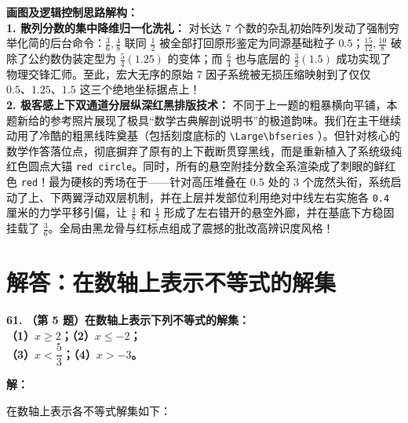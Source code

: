 \vspace{0.4cm}
{\small\color{blue!70!black}
\textbf{画图及逻辑控制思路解构：}\\
\textbf{1. 散列分数的集中降维归一化洗礼：} 对长达 $7$ 个数的杂乱初始阵列发动了强制穷举化简的后台命令：$\frac{3}{6}, \frac{4}{8}$ 联同 $\frac{1}{2}$ 被全部打回原形鉴定为同源基础粒子 $0.5$；$\frac{15}{12}, \frac{10}{8}$ 破除了公约数伪装定型为 $\frac{5}{4} (1.25)$ 的变体；而 $\frac{6}{4}$ 也与底层的 $\frac{3}{2} (1.5)$ 成功实现了物理交锋汇师。至此，宏大无序的原始 $7$ 因子系统被无损压缩映射到了仅仅 $0.5、 1.25、 1.5$ 这三个绝地坐标据点上！\\
\textbf{2. 极客感上下双通道分层纵深红黑排版技术：} 不同于上一题的粗暴横向平铺，本题新给的参考照片展现了极具“数学古典解剖说明书”的极道韵味。我们在主干继续动用了冷酷的粗黑线阵奠基（包括刻度底标的 \texttt{\textbackslash{}Large\textbackslash{}bfseries} ）。但针对核心的数学作答落位点，彻底摒弃了原有的上下截断贯穿黑线，而是重新植入了系统级纯红色圆点大锚 \texttt{red circle}。同时，所有的悬空附挂分数全系渲染成了刺眼的鲜红色 \texttt{red}！最为硬核的秀场在于——针对高压堆叠在 $0.5$ 处的 $3$ 个庞然头衔，系统启动了上、下两翼浮动双层机制，并在上层并发部位利用绝对中线左右实施各 \texttt{0.4} 厘米的力学平移引偏，让 $\frac{4}{8}$ 和 $\frac{1}{2}$ 形成了左右错开的悬空外廊，并在基底下方稳固挂载了 $\frac{3}{6}$。全局由黑龙骨与红标点组成了震撼的批改高辨识度风格！
}

\newpage




\section{解答：在数轴上表示不等式的解集}

\vspace{0.6cm}

\textbf{\LARGE 61.} \textbf{（第 5 题）在数轴上表示下列不等式的解集：\\
（1）$x \geqslant 2$；\qquad\quad （2）$x \leqslant -2$；\\
（3）$x < \dfrac{5}{3}$；\qquad\quad （4）$x > -3$。}

\vspace{0.4cm}
\textbf{解：}

在数轴上表示各不等式解集如下：

\vspace{0.4cm}

